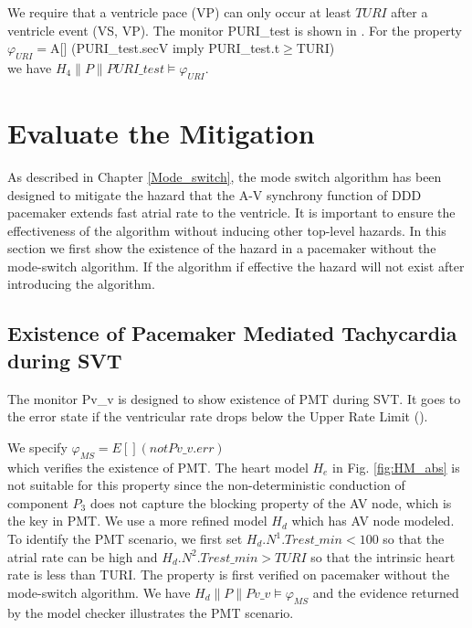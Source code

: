 We require that a ventricle pace (VP) can only occur at least $TURI$ after a ventricle event (VS, VP). The monitor \textsf{PURI\_test} is shown in . For the property\\
$\varphi_{URI}=$\textsf{A[] (PURI\_test.secV imply PURI\_test.t$\geq$TURI)} \\
we have $H_4\| P\| PURI\_test\models \varphi_{URI}$.

\section{Evaluate the Mitigation}
As described in Chapter \ref{Mode_switch}, the mode switch algorithm has been designed to mitigate the hazard that the A-V synchrony function of DDD pacemaker extends fast
atrial rate to the ventricle. It is important to ensure the effectiveness of the algorithm without inducing other top-level hazards. In this section we first show the existence of the hazard in a pacemaker without the mode-switch algorithm. If the algorithm if effective the hazard will not exist after introducing the algorithm.
\subsection{Existence of Pacemaker Mediated Tachycardia during SVT}
The monitor \textsf{Pv\_v} is designed to show existence of PMT during SVT. It goes to the error state if the ventricular rate drops below the Upper Rate Limit ().  


We specify 
$\varphi_{MS}=E[] (not Pv\_v.err)$\\
which verifies the existence of PMT. The heart model $H_e$ in Fig. \ref{fig:HM_abs} is not suitable for this property since the non-deterministic conduction of component $P_3$ does not capture the blocking property of the AV node, which is the key in PMT. We use a more refined model $H_d$ which has AV node modeled. To identify the PMT scenario, we first set $H_d.N^1.Trest\_min<100$ so that the atrial rate can be high and $H_d.N^2.Trest\_min>TURI$ so that the intrinsic heart rate is less than TURI. The property is first verified on pacemaker without the mode-switch algorithm. We have $H_d\|P\|Pv\_v\models\varphi_{MS}$ and the evidence returned by the model checker illustrates the PMT scenario.


